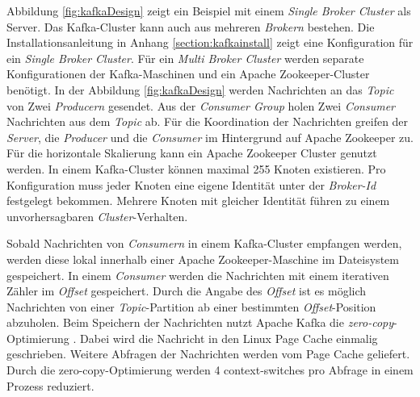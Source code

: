 Abbildung \ref{fig:kafkaDesign} zeigt ein Beispiel mit einem \textit{Single Broker Cluster} als Server. Das Kafka-Cluster kann auch aus mehreren \textit{Brokern} bestehen. Die Installationsanleitung in Anhang \ref{section:kafkainstall} zeigt eine Konfiguration für ein \textit{Single Broker Cluster}. Für ein \textit{Multi Broker Cluster} werden separate Konfigurationen der Kafka-Maschinen und ein Apache Zookeeper-Cluster benötigt. In der Abbildung \ref{fig:kafkaDesign} werden Nachrichten an das \textit{Topic} von Zwei \textit{Producern} gesendet. Aus der \textit{Consumer Group} holen Zwei \textit{Consumer} Nachrichten aus dem \textit{Topic} ab. Für die Koordination der Nachrichten greifen der \textit{Server}, die \textit{Producer} und die \textit{Consumer} im Hintergrund auf Apache Zookeeper zu. Für die horizontale Skalierung kann ein Apache Zookeeper Cluster genutzt werden. In einem Kafka-Cluster können maximal 255 Knoten existieren. Pro Konfiguration muss jeder Knoten eine eigene Identität unter der \textit{Broker-Id} festgelegt bekommen. Mehrere Knoten mit gleicher Identität führen zu einem unvorhersagbaren \textit{Cluster}-Verhalten. 

Sobald Nachrichten von \textit{Consumern} in einem Kafka-Cluster empfangen werden, werden diese lokal innerhalb einer Apache Zookeeper-Maschine im Dateisystem gespeichert. In einem \textit{Consumer} werden die Nachrichten mit einem iterativen Zähler im \textit{Offset} gespeichert. Durch die Angabe des \textit{Offset} ist es möglich Nachrichten von einer \textit{Topic}-Partition ab einer bestimmten \textit{Offset}-Position abzuholen. Beim Speichern der Nachrichten nutzt Apache Kafka die \textit{zero-copy}-Optimierung . Dabei wird die Nachricht in den Linux Page Cache einmalig geschrieben. Weitere Abfragen der Nachrichten werden vom Page Cache geliefert. Durch die zero-copy-Optimierung werden 4 context-switches pro Abfrage in einem Prozess reduziert. 

